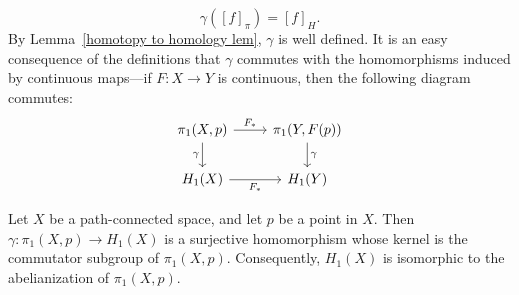 \[\gamma([f]_\pi)=[f]_H.\]
By Lemma~\ref{homotopy to homology lem}, $\gamma$ is well defined. It is an easy consequence of the definitions that $\gamma$ commutes with the homomorphisms induced by continuous maps—if $F:X\to Y$ is continuous, then the following diagram commutes:
\begin{equation}\label{Hurewicz map-1}
\begin{tikzcd}
\pi_1(X,p)\ar[d,swap,"\gamma"]\ar[r,"F_*"]&\pi_1(Y,F(p))\ar[d,"\gamma"]\\
H_1(X)\ar[r,swap,"F_*"]&H_1(Y)
\end{tikzcd}
\end{equation}
\begin{theorem}\label{Hurewicz}
Let $X$ be a path-connected space, and let $p$ be a point in $X$. Then
$\gamma:\pi_1(X,p)\to H_1(X)$ is a surjective homomorphism whose kernel is the commutator subgroup of $\pi_1(X,p)$. Consequently, $H_1(X)$ is isomorphic to the abelianization of $\pi_1(X,p)$.
\end{theorem}
